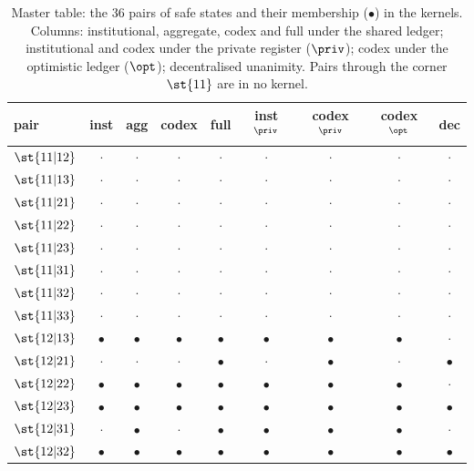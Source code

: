 \begin{table}[H]
\centering\footnotesize
\caption{Master table: the $36$ pairs of safe states and their membership ($\bullet$) in the kernels. Columns: institutional, aggregate, codex and full under the shared ledger; institutional and codex under the private register ($\priv$); codex under the optimistic ledger ($\opt$); decentralised unanimity. Pairs through the corner $\st{11}$ are in no kernel.}
\label{tab:master}
\begin{tabular}{lcccccccc}
\toprule
pair & inst & agg & codex & full & inst$^{\priv}$ & codex$^{\priv}$ & codex$^{\opt}$ & dec \\
\midrule
$\st{11|12}$ & $\cdot$ & $\cdot$ & $\cdot$ & $\cdot$ & $\cdot$ & $\cdot$ & $\cdot$ & $\cdot$ \\
$\st{11|13}$ & $\cdot$ & $\cdot$ & $\cdot$ & $\cdot$ & $\cdot$ & $\cdot$ & $\cdot$ & $\cdot$ \\
$\st{11|21}$ & $\cdot$ & $\cdot$ & $\cdot$ & $\cdot$ & $\cdot$ & $\cdot$ & $\cdot$ & $\cdot$ \\
$\st{11|22}$ & $\cdot$ & $\cdot$ & $\cdot$ & $\cdot$ & $\cdot$ & $\cdot$ & $\cdot$ & $\cdot$ \\
$\st{11|23}$ & $\cdot$ & $\cdot$ & $\cdot$ & $\cdot$ & $\cdot$ & $\cdot$ & $\cdot$ & $\cdot$ \\
$\st{11|31}$ & $\cdot$ & $\cdot$ & $\cdot$ & $\cdot$ & $\cdot$ & $\cdot$ & $\cdot$ & $\cdot$ \\
$\st{11|32}$ & $\cdot$ & $\cdot$ & $\cdot$ & $\cdot$ & $\cdot$ & $\cdot$ & $\cdot$ & $\cdot$ \\
$\st{11|33}$ & $\cdot$ & $\cdot$ & $\cdot$ & $\cdot$ & $\cdot$ & $\cdot$ & $\cdot$ & $\cdot$ \\
$\st{12|13}$ & $\bullet$ & $\bullet$ & $\bullet$ & $\bullet$ & $\bullet$ & $\bullet$ & $\bullet$ & $\cdot$ \\
$\st{12|21}$ & $\cdot$ & $\cdot$ & $\cdot$ & $\bullet$ & $\cdot$ & $\bullet$ & $\cdot$ & $\bullet$ \\
$\st{12|22}$ & $\bullet$ & $\bullet$ & $\bullet$ & $\bullet$ & $\bullet$ & $\bullet$ & $\bullet$ & $\cdot$ \\
$\st{12|23}$ & $\bullet$ & $\bullet$ & $\bullet$ & $\bullet$ & $\bullet$ & $\bullet$ & $\bullet$ & $\bullet$ \\
$\st{12|31}$ & $\cdot$ & $\bullet$ & $\cdot$ & $\bullet$ & $\bullet$ & $\bullet$ & $\bullet$ & $\cdot$ \\
$\st{12|32}$ & $\bullet$ & $\bullet$ & $\bullet$ & $\bullet$ & $\bullet$ & $\bullet$ & $\bullet$ & $\bullet$ \\

\end{tabular}
\end{table}

